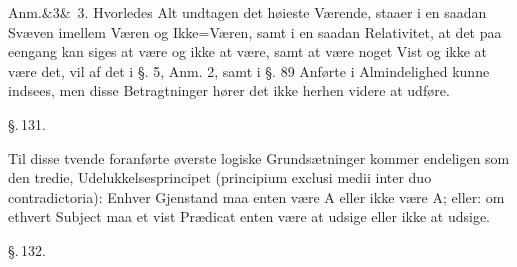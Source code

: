 \documentclass[12pt]{book}
\def\sperr#1{#1}%
\def\textit#1{#1}%
\def\emph#1{#1}%
\newcommand{\sperr}[1]{\textls[180]{#1}}
\newcommand{\parag}[1]{%
  \par\vspace{0.9\baselineskip}%
  {\centering\textit{\S.\,#1.}\par}%
  \vspace{0.35\baselineskip}%
  \noindent\hspace{\parindent}\ignorespaces
}
\newcommand{\anm}[1]{%
  \par\vspace{0.5\baselineskip}%
  \noindent\hspace{\parindent}\sperr{Anm.}\ifx&#1&\else~\textit{#1}.\fi
  \enspace\ignorespaces
}
\begin{document}
\anm{3} Hvorledes Alt undtagen det høieste Værende, staaer i en saadan Svæven
imellem Væren og Ikke=Væren, samt i en saadan Relativitet, at det paa eengang
kan siges at være og ikke at være, samt at være noget Vist og ikke at være det,
vil af det i §. 5, Anm. 2, samt i §. 89 Anførte i Almindelighed kunne indsees,
men disse Betragtninger hører det ikke herhen videre at udføre.

\parag{131}

Til disse tvende foranførte øverste logiske Grundsætninger kommer endeligen som
den tredie, \emph{Udelukkelsesprincipet} (\textit{principium exclusi medii
inter duo contradictoria}): Enhver Gjenstand maa enten være \textit{A} eller
ikke være \textit{A}; eller: om ethvert Subject maa et vist Prædicat enten være
at udsige eller ikke at udsige.

\parag{132}
\end{document}
